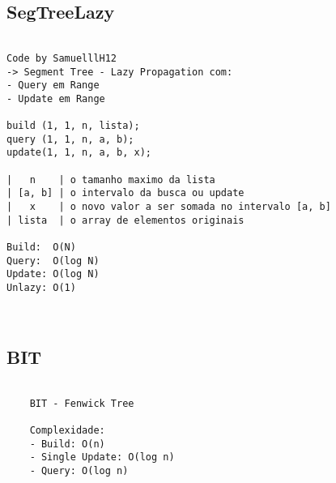 \vspace{-2pt}
\subsection{SegTreeLazy}
\vspace{-4pt}
\begin{lstlisting}[style=description]

Code by SamuelllH12
-> Segment Tree - Lazy Propagation com:
- Query em Range
- Update em Range

build (1, 1, n, lista);
query (1, 1, n, a, b);
update(1, 1, n, a, b, x);

|   n    | o tamanho maximo da lista
| [a, b] | o intervalo da busca ou update
|   x    | o novo valor a ser somada no intervalo [a, b]
| lista  | o array de elementos originais

Build:  O(N)
Query:  O(log N)
Update: O(log N)
Unlazy: O(1)



\end{lstlisting}
\vspace{-5pt}
\raggedbottom
\hrulefill

\vspace{-2pt}
\subsection{BIT}
\vspace{-4pt}
\begin{lstlisting}[style=description]

    BIT - Fenwick Tree

    Complexidade:
    - Build: O(n)
    - Single Update: O(log n)
    - Query: O(log n)


\end{lstlisting}
\vspace{-5pt}
\raggedbottom
\hrulefill

\vspace{-2pt}
